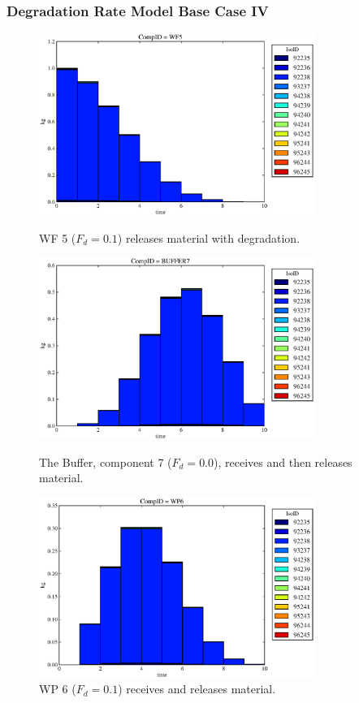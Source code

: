 \begin{frame}
  \frametitle{Degradation Rate Model Base Case IV}
  \begin{figure}
\begin{minipage}[b]{0.45\linewidth}

  \includegraphics[width=0.8\textwidth]{./images/drIV1.eps}
  \caption[DRIV WF Contaminants.]{
    WF 5 ($F_d = 0.1$) releases material with degradation. 
    }
  \label{fig:drIVwf5}
  
  \includegraphics[width=0.8\textwidth]{./images/drIV3.eps}
  \caption[Case DRIV Buffer Contaminants]{
    The Buffer, component 7 ($F_d=0.0$), receives and then releases material.
    }
  \label{fig:drIVbuff}

\end{minipage}
\hspace{0.05\linewidth}
\begin{minipage}[b]{0.45\linewidth}
  \includegraphics[width=0.8\textwidth]{./images/drIV2.eps}
  \caption[Case DRIV WP Contaminants.]{ 
    WP 6 ($F_d = 0.1$) receives and releases material. 
    }
  \label{fig:drIVwp6}


\end{minipage}
\end{figure}
\end{frame}
